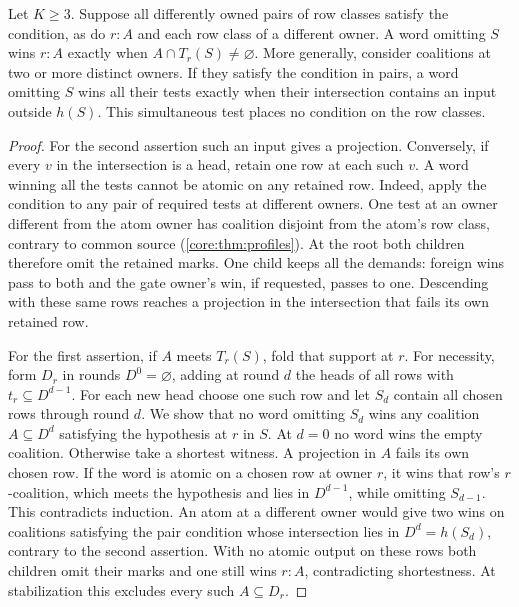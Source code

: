 \begin{theorem}
\label{core:thm:triangle-free-neighborhood-profile}
Let $K\ge3$. Suppose all differently owned pairs of row classes
satisfy the condition, as do $r:A$ and each row class of a different
owner. A word omitting $S$ wins $r:A$ exactly when
$A\cap T_r(S)\ne\varnothing$.
More generally, consider coalitions at two or more distinct owners.
If they satisfy the condition in pairs, a word omitting $S$ wins
all their tests exactly when their intersection contains an input
outside $h(S)$. This simultaneous test places no condition on the
row classes.
\end{theorem}
\begin{proof}
For the second assertion such an input gives a projection. Conversely,
if every $v$ in the intersection is a head, retain one row at each
such $v$. A word winning all the tests cannot be atomic on any
retained row. Indeed, apply the condition to any pair of required
tests at different owners. One test at an owner different from the
atom owner has coalition disjoint from the atom's row class,
contrary to common source (\cref{core:thm:profiles}).
At the root both children therefore omit the retained marks. One child keeps all the
demands: foreign wins pass to both and the gate owner's win, if
requested, passes to one. Descending with these same rows reaches a
projection in the intersection that fails its own retained row.

For the first assertion, if $A$ meets $T_r(S)$, fold that support at
$r$. For necessity, form $D_r$ in rounds $D^0=\varnothing$,
adding at round $d$ the heads of all rows with $t_r\subseteq D^{d-1}$.
For each new head choose one such row and let $S_d$ contain all chosen
rows through round $d$. We show that no word omitting $S_d$ wins any
coalition $A\subseteq D^d$ satisfying the hypothesis at $r$ in $S$.
At $d=0$ no word wins the empty coalition. Otherwise take a shortest witness. A
projection in $A$ fails its own chosen row. If the word is atomic on
a chosen row at owner $r$, it wins that row's $r$-coalition, which
meets the hypothesis and lies in $D^{d-1}$, while omitting $S_{d-1}$.
This contradicts induction. An atom at a different owner would give
two wins on coalitions satisfying the pair condition
whose intersection lies in $D^d=h(S_d)$, contrary
to the second assertion. With no atomic output on these rows both
children omit their marks and one still wins $r:A$, contradicting
shortestness. At stabilization this excludes every such
$A\subseteq D_r$.
\end{proof}

